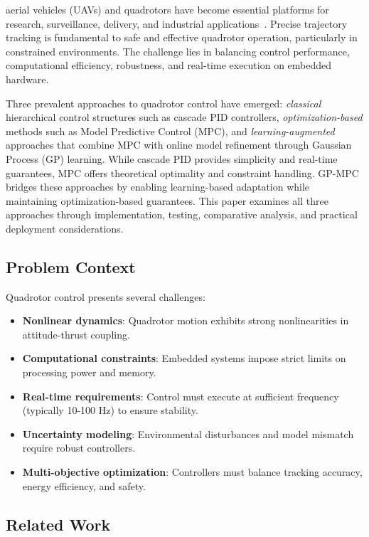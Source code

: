 \documentclass[journal]{IEEEtran}
\begin{document}
 aerial vehicles (UAVs) and quadrotors have become essential platforms for research, surveillance, delivery, and industrial applications~\cite{IEEEexample:quadrotor_survey}. Precise trajectory tracking is fundamental to safe and effective quadrotor operation, particularly in constrained environments. The challenge lies in balancing control performance, computational efficiency, robustness, and real-time execution on embedded hardware.

Three prevalent approaches to quadrotor control have emerged: \textit{classical} hierarchical control structures such as cascade PID controllers, \textit{optimization-based} methods such as Model Predictive Control (MPC), and \textit{learning-augmented} approaches that combine MPC with online model refinement through Gaussian Process (GP) learning. While cascade PID provides simplicity and real-time guarantees, MPC offers theoretical optimality and constraint handling. GP-MPC bridges these approaches by enabling learning-based adaptation while maintaining optimization-based guarantees. This paper examines all three approaches through implementation, testing, comparative analysis, and practical deployment considerations.

\subsection{Problem Context}
Quadrotor control presents several challenges:
\begin{itemize}
    \item \textbf{Nonlinear dynamics}: Quadrotor motion exhibits strong nonlinearities in attitude-thrust coupling.
    \item \textbf{Computational constraints}: Embedded systems impose strict limits on processing power and memory.
    \item \textbf{Real-time requirements}: Control must execute at sufficient frequency (typically 10-100 Hz) to ensure stability.
    \item \textbf{Uncertainty modeling}: Environmental disturbances and model mismatch require robust controllers.
    \item \textbf{Multi-objective optimization}: Controllers must balance tracking accuracy, energy efficiency, and safety.
\end{itemize}

\subsection{Related Work}
\end{document}
